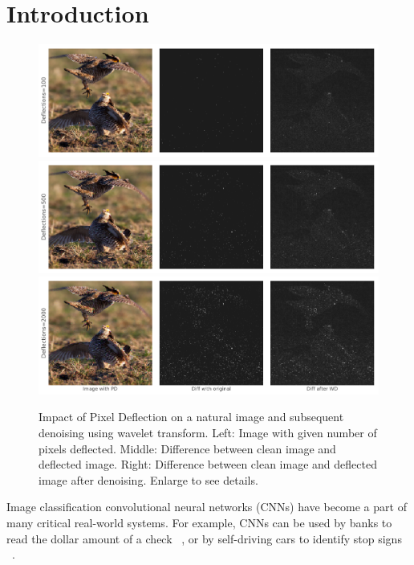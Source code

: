 \section{Introduction}
\begin{figure}
   \includegraphics[width=1\linewidth]{figures/pixel/image_corruption_x_100.pdf}
   \includegraphics[width=1\linewidth]{figures/pixel/image_corruption_x_500.pdf}
   \includegraphics[width=1\linewidth]{figures/pixel/image_corruption_x_2000.pdf}
   \label{fig:pixeldeflection}
   \caption{Impact of Pixel Deflection on a natural image and subsequent denoising using wavelet transform. Left: Image with given number of pixels deflected. Middle: Difference between clean image and deflected image. Right: Difference between clean image and deflected image after denoising. Enlarge to see details.}
   
\end{figure}

Image classification convolutional neural networks (CNNs) have become a part of many critical real-world systems.
For example, CNNs can be used by banks to read the dollar amount of a check ~\cite{Bottou1997GlobalTO}, or by self-driving cars to identify stop signs ~\cite{Papernot2016PracticalBA}.%

